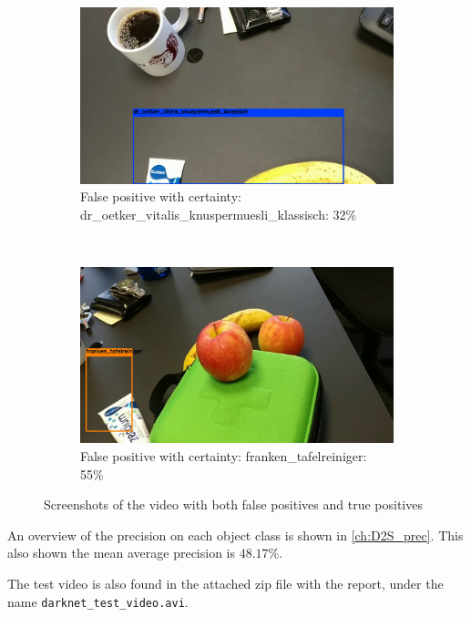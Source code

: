 \begin{figure}[H]
	\begin{subfigure}[b]{0.48\textwidth}
		\includegraphics[width=\textwidth]{figures/yolo3}
		\caption{False positive with certainty: dr_oetker_vitalis_knuspermuesli_klassisch: 32\%}
		\label{fig:yolo3}
	\end{subfigure}
	~
	\begin{subfigure}[b]{0.48\textwidth}
		\includegraphics[width=\textwidth]{figures/yolo4}
		\caption{False positive with certainty: franken_tafelreiniger: 55\%\\}
		\label{fig:yolo4}
	\end{subfigure}
\caption{Screenshots of the video with both false positives and true positives}
\label{fig:yolo_video}
\end{figure}

An overview of the precision on each object class is shown in \autoref{ch:D2S_prec}. This also shown the mean average precision is $ 48.17 \% $.

The test video is also found in the attached zip file with the report, under the name \lstinline|darknet_test_video.avi|.

